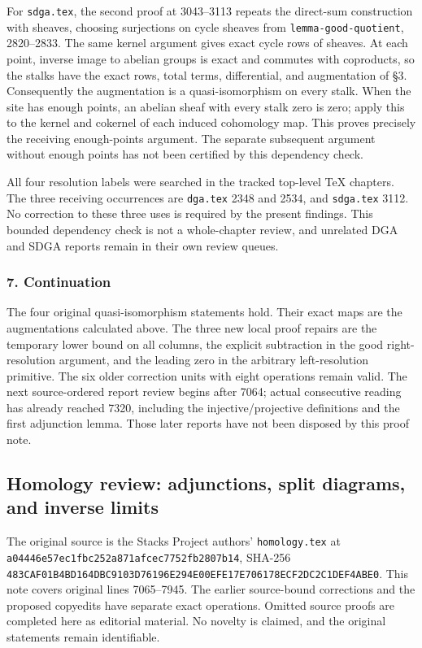 \documentclass[11pt]{article}
\begin{document}
For \texttt{sdga.tex}, the second proof at 3043--3113 repeats the direct-sum construction with sheaves, choosing surjections on cycle sheaves from \texttt{lemma-good-quotient}, 2820--2833. The same kernel argument gives exact cycle rows of sheaves. At each point, inverse image to abelian groups is exact and commutes with coproducts, so the stalks have the exact rows, total terms, differential, and augmentation of §3. Consequently the augmentation is a quasi-isomorphism on every stalk. When the site has enough points, an abelian sheaf with every stalk zero is zero; apply this to the kernel and cokernel of each induced cohomology map. This proves precisely the receiving enough-points argument. The separate subsequent argument without enough points has not been certified by this dependency check.

All four resolution labels were searched in the tracked top-level TeX chapters. The three receiving occurrences are \texttt{dga.tex} 2348 and 2534, and \texttt{sdga.tex} 3112. No correction to these three uses is required by the present findings. This bounded dependency check is not a whole-chapter review, and unrelated DGA and SDGA reports remain in their own review queues.

\subsubsection{7. Continuation}\label{continuation}

The four original quasi-isomorphism statements hold. Their exact maps are the augmentations calculated above. The three new local proof repairs are the temporary lower bound on all columns, the explicit subtraction in the good right-resolution argument, and the leading zero in the arbitrary left-resolution primitive. The six older correction units with eight operations remain valid. The next source-ordered report review begins after 7064; actual consecutive reading has already reached 7320, including the injective/projective definitions and the first adjunction lemma. Those later reports have not been disposed by this proof note.
\clearpage
\subsection{Homology review: adjunctions, split diagrams, and inverse limits}\label{homology-review-adjunctions-split-diagrams-and-inverse-limits}

The original source is the Stacks Project authors' \texttt{homology.tex} at \texttt{a04446e57ec1fbc252a871afcec7752fb2807b14}, SHA-256 \texttt{483CAF01B4BD164DBC9103D76196E294E00EFE17E706178ECF2DC2C1DEF4ABE0}. This note covers original lines 7065--7945. The earlier source-bound corrections and the proposed copyedits have separate exact operations. Omitted source proofs are completed here as editorial material. No novelty is claimed, and the original statements remain identifiable.
\end{document}
